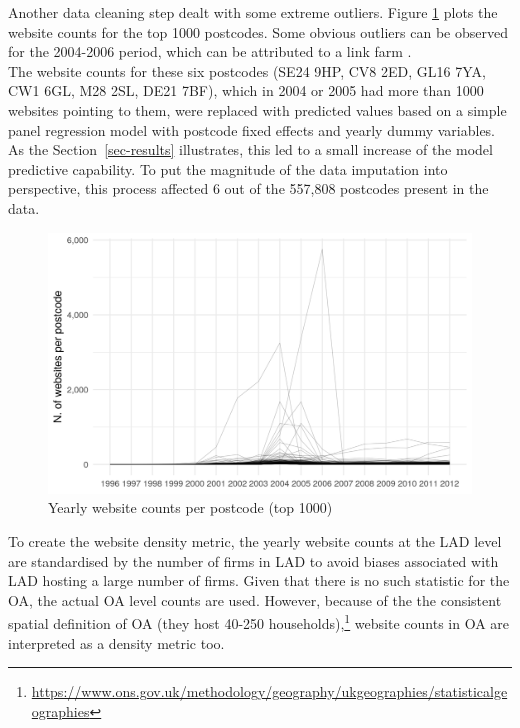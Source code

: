 \documentclass[
  authoryear,
  preprint,
  3p]{elsarticle}
\begin{document}
Another data cleaning step dealt with some extreme outliers. Figure
\ref{pc1} plots the website counts for the top 1000 postcodes. Some
obvious outliers can be observed for the 2004-2006 period, which can be
attributed to a link farm \citep{BL2013links}.\\
The website counts for these six postcodes (SE24 9HP, CV8 2ED, GL16 7YA,
CW1 6GL, M28 2SL, DE21 7BF), which in 2004 or 2005 had more than 1000
websites pointing to them, were replaced with predicted values based on
a simple panel regression model with postcode fixed effects and yearly
dummy variables. As the Section~\ref{sec-results} illustrates, this led
to a small increase of the model predictive capability. To put the
magnitude of the data imputation into perspective, this process affected
6 out of the 557,808 postcodes present in the data.

\begin{figure}[H]

{\centering \includegraphics[width=1\textwidth,height=0.6\textheight]{../../outputs/pc_year_1.png}

}

\caption{\label{pc1}Yearly website counts per postcode (top 1000)}

\end{figure}%

To create the website density metric, the yearly website counts at the
LAD level are standardised by the number of firms in LAD to avoid biases
associated with LAD hosting a large number of firms. Given that there is
no such statistic for the OA, the actual OA level counts are used.
However, because of the the consistent spatial definition of OA (they
host 40-250 households),\footnote{\url{https://www.ons.gov.uk/methodology/geography/ukgeographies/statisticalgeographies}}
website counts in OA are interpreted as a density metric too.
\end{document}
